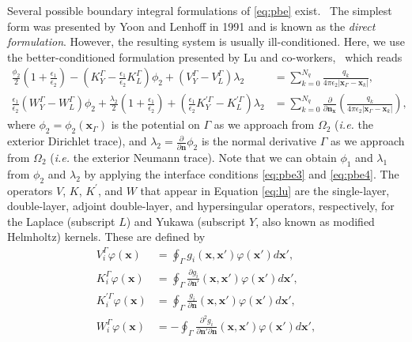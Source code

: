 Several possible boundary integral formulations of \eqref{eq:pbe} exist.~\cite{search2022towards} The simplest form was presented by Yoon and Lenhoff in 1991\cite{YoonLenhoff1990} and is known as the \emph{direct formulation}. However, the resulting system is usually ill-conditioned. Here, we use the better-conditioned formulation presented by Lu and co-workers,~\cite{LuETal2006, LuETal2009,debuhr2016dashmm} which reads
%
\begin{align}\label{eq:lu}
    \tfrac{\phi_2}{2}\left(1+\tfrac{\epsilon_1}{\epsilon_2}\right) - \left(K_Y^\Gamma - \tfrac{\epsilon_1}{\epsilon_2}K_L^\Gamma\right)\phi_2 + \left(V_Y^\Gamma - V_L^\Gamma\right)\lambda_2 &= \sum_{k=0}^{N_q}  \frac{q_k}{4\pi\epsilon_2|\mathbf{x}_{\Gamma} - \mathbf{x}_k|},
     \nonumber \\
    \tfrac{\epsilon_1}{\epsilon_2}\left(W_Y^\Gamma - W_L^\Gamma\right)\phi_2 +  \tfrac{\lambda_2}{2}\left(1+\tfrac{\epsilon_1}{\epsilon_2}\right) + \left(\tfrac{\epsilon_1}{\epsilon_2}K_Y^{\prime\Gamma} - K_L^{\prime\Gamma}\right)\lambda_2 &= \sum_{k=0}^{N_q}  \frac{\partial}{\partial\mathbf{n}_\mathbf{x}}\left(\frac{q_k}{4\pi\epsilon_2|\mathbf{x}_{\Gamma} - \mathbf{x}_k|}\right),
\end{align}
where $\phi_2 = \phi_2(\mathbf{x}_\Gamma)$ is the potential on $\Gamma$ as we approach from $\Omega_2$ ({\it i.e.} the exterior Dirichlet trace),
and $\lambda_2 = \frac{\partial}{\partial \mathbf{n}}\phi_2$ is the normal derivative $\Gamma$ as we approach from $\Omega_2$ ({\it i.e.} the exterior Neumann trace).
Note that we can obtain $\phi_1$ and $\lambda_1$ from $\phi_2$ and $\lambda_2$ by applying the interface conditions \eqref{eq:pbe3} and \eqref{eq:pbe4}.
The operators $V$, $K$, $K^{\prime}$, and $W$ that appear in Equation \eqref{eq:lu} are the single-layer, double-layer, adjoint double-layer, and hypersingular operators, respectively, for the Laplace (subscript $L$) and Yukawa (subscript $Y$, also known as modified Helmholtz) kernels. These are defined %
by
%
\begin{align}\label{eq:all_op}
V_i^\Gamma \varphi (\mathbf{x}) &= \oint_\Gamma g_i(\mathbf{x},\mathbf{x}')\varphi(\mathbf{x}')d\mathbf{x}',\nonumber\\
K_i^\Gamma \varphi (\mathbf{x}) &= \oint_\Gamma \frac{\partial g_i}{\partial\mathbf{n}'}(\mathbf{x},\mathbf{x}')\varphi(\mathbf{x}')d\mathbf{x}',\nonumber\\
K^{\prime\Gamma}_i\varphi (\mathbf{x}) &= \oint_\Gamma \frac{g_i}{\partial\mathbf{n}}(\mathbf{x},\mathbf{x}')\varphi(\mathbf{x}')d\mathbf{x}',\nonumber\\
W^\Gamma_i\varphi (\mathbf{x}) &= - \oint_\Gamma \frac{\partial^2 g_i}{\partial\mathbf{n}'\partial\mathbf{n}}(\mathbf{x},\mathbf{x}')\varphi(\mathbf{x}')d\mathbf{x}',
\end{align}

